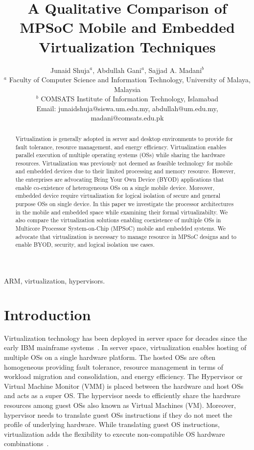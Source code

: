\documentclass[journal, 10pt]{IEEEtran}
\begin{document}
\title{A Qualitative Comparison of MPSoC Mobile and Embedded Virtualization Techniques}
\author{Junaid Shuja$^a$, Abdullah Gani$^a$, Sajjad A. Madani$^b$ \\ $^a$ Faculty of Computer Science and Information Technology, University of Malaya, Malaysia\\ $^b$ COMSATS Institute of Information Technology, Islamabad\\ Email: junaidshuja@siswa.um.edu.my, abdullah@um.edu.my, madani@comsats.edu.pk} 

\maketitle

\begin{abstract}
Virtualization is generally adopted in server and desktop environments to provide for fault tolerance, resource management, and energy efficiency. Virtualization enables parallel execution of multiple operating systems (OSs) while sharing the hardware resources. Virtualization was previously not deemed as feasible technology for mobile and embedded devices due to their limited processing and memory resource. However, the enterprises are advocating Bring Your Own Device (BYOD) applications that enable co-existence of heterogeneous OSs on a single mobile device. Moreover, embedded device require virtualization for logical isolation of secure and general purpose OSs on single device. In this paper we investigate the processor architectures in the mobile and embedded space while examining their formal virtualizabilty. We also compare the virtualization solutions enabling coexistence of multiple OSs in Multicore Processor System-on-Chip (MPSoC) mobile and embedded systems. We advocate that virtualization is necessary to manage resource in MPSoC designs and to enable BYOD, security, and logical isolation use cases.
\end{abstract}

\begin{IEEEkeywords}
ARM, virtualization, hypervisors.
\end{IEEEkeywords}

\section{Introduction}\label{sec:intro}
Virtualization technology has been deployed in server space for decades since the early IBM mainframe systems~\cite{Popek1974}. In server space, virtualization enables hosting of multiple OSs on a single hardware platform. The hosted OSs are often homogeneous providing fault tolerance, resource management in terms of workload migration and consolidation, and energy efficiency. The Hypervisor or Virtual Machine Monitor (VMM) is placed between the hardware and host OSs and acts as a super OS. The hypervisor needs to efficiently share the hardware resources among guest OSs also known as Virtual Machines (VM). Moreover, hypervisor needs to translate guest OSs instructions if they do not meet the profile of underlying hardware. While translating guest OS instructions, virtualization adds the flexibility to execute non-compatible OS hardware combinations~\cite{Aguiar2010}.
\end{document}
